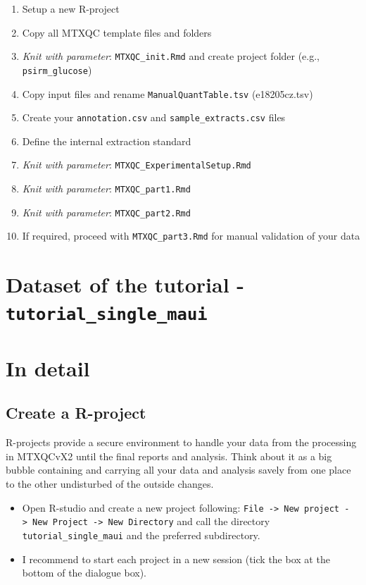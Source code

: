 \documentclass[]{book}
\providecommand{\tightlist}{%
  \setlength{\itemsep}{0pt}\setlength{\parskip}{0pt}}
\theoremstyle{definition}
\theoremstyle{definition}
\theoremstyle{definition}
\theoremstyle{remark}
\begin{document}
\begin{enumerate}
\def\labelenumi{\arabic{enumi}.}
\tightlist
\item
  Setup a new R-project
\item
  Copy all MTXQC template files and folders
\item
  \emph{Knit with parameter}: \texttt{MTXQC\_init.Rmd} and create
  project folder (e.g., \texttt{psirm\_glucose})
\item
  Copy input files and rename \texttt{ManualQuantTable.tsv}
  (e18205cz.tsv)
\item
  Create your \texttt{annotation.csv} and \texttt{sample\_extracts.csv}
  files
\item
  Define the internal extraction standard
\item
  \emph{Knit with parameter}: \texttt{MTXQC\_ExperimentalSetup.Rmd}
\item
  \emph{Knit with parameter}: \texttt{MTXQC\_part1.Rmd}
\item
  \emph{Knit with parameter}: \texttt{MTXQC\_part2.Rmd}
\item
  If required, proceed with \texttt{MTXQC\_part3.Rmd} for manual
  validation of your data
\end{enumerate}

\section{\texorpdfstring{Dataset of the tutorial -
\texttt{tutorial\_single\_maui}}{Dataset of the tutorial - tutorial\_single\_maui}}\label{dataset-of-the-tutorial---tutorial_single_maui}

\section{In detail}\label{indetail-maui}

\subsection{Create a R-project}\label{create-a-r-project}

R-projects provide a secure environment to handle your data from the
processing in MTXQCvX2 until the final reports and analysis. Think about
it as a big bubble containing and carrying all your data and analysis
savely from one place to the other undisturbed of the outside changes.

\begin{itemize}
\tightlist
\item
  Open R-studio and create a new project following:
  \texttt{File\ -\textgreater{}\ New\ project\ -\textgreater{}\ New\ Project\ -\textgreater{}\ New\ Directory}
  and call the directory \texttt{tutorial\_single\_maui} and the
  preferred subdirectory.
\item
  I recommend to start each project in a new session (tick the box at
  the bottom of the dialogue box).
\end{itemize}
\end{document}

